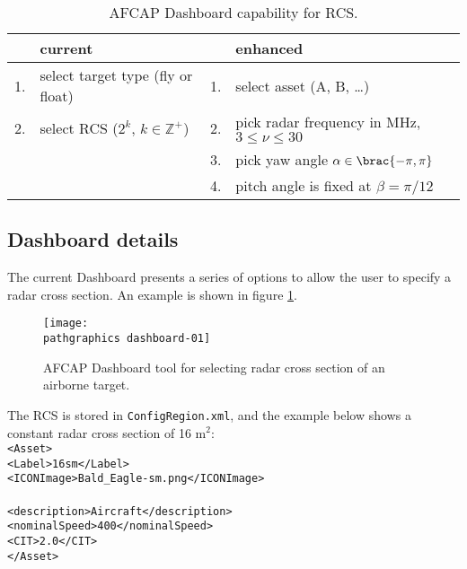 \begin{table}[htp]
	\begin{center}
		\begin{tabular}{rlrl}
			& current && enhanced \\\hline
			1. & select target type (fly or float) & 1. & select asset (A, B, \dots) \\
			2. & select RCS ($2^{k}$, $k\in\mathbb{Z}^{+}$) & 2. & pick radar frequency in MHz, $3\le \nu \le 30$ \\
				&&3. & pick yaw angle $\alpha\in\brac{-\pi,\pi}$ \\
				&&4. & pitch angle is fixed at $\beta = \pi / 12$ \\
		\end{tabular}
	\end{center}
\caption{AFCAP Dashboard capability for RCS.}
\label{tab:dashboard}
\end{table}%


\subsection{Dashboard details}
The current Dashboard presents a series of options to allow the user to specify a radar cross section. An example is shown in figure \ref{fig:rcs-dashboard}.
\begin{figure}[htbp]
	\begin{center}
		\texttt{[image: \\pathgraphics dashboard-01]}
	\end{center}
\caption{AFCAP Dashboard tool for selecting radar cross section of an airborne target.}
\label{fig:rcs-dashboard}
\end{figure}

The RCS is stored in \texttt{ConfigRegion.xml}, and the example below shows a constant radar cross section of 16 m$^{2}$:\\

\indent\texttt{<Asset>} \\
\indent\texttt{\quad <Label>16sm</Label>} \\
\indent\texttt{\quad <ICONImage>Bald\_Eagle-sm.png</ICONImage>} \\
\indent\texttt{\quad \color{blue}{<crossSection>16</crossSection>}} \\
\indent\texttt{\quad <description>Aircraft</description>} \\
\indent\texttt{\quad <nominalSpeed>400</nominalSpeed>} \\
\indent\texttt{\quad <CIT>2.0</CIT>} \\
\indent\texttt{</Asset>} \\

